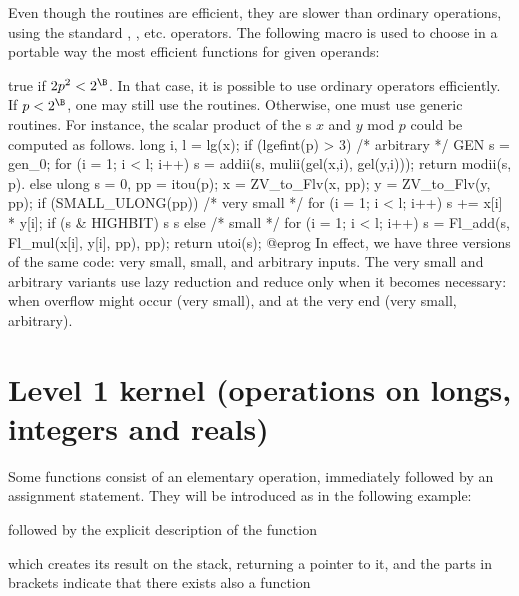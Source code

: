
Even though the  routines are efficient, they are slower than
ordinary  operations, using the standard \kbd{+}, \kbd{\%}, etc.
operators.
The following macro is used to choose in a portable way the most efficient
functions for given operands:

 true if $2p^2 <2^\B$. In that case, it is
possible to use ordinary operators efficiently. If $p < 2^\B$, one
may still use the  routines. Otherwise, one must use generic
routines. For instance, the scalar product of the s $x$ and $y$ mod
$p$ could be computed as follows.
\bprog
    long i, l = lg(x);
    if (lgefint(p) > 3)
    { /* arbitrary */
      GEN s = gen_0;
      for (i = 1; i < l; i++) s = addii(s, mulii(gel(x,i), gel(y,i)));
      return modii(s, p).
    }
    else
    {
      ulong s = 0, pp = itou(p);
      x = ZV_to_Flv(x, pp);
      y = ZV_to_Flv(y, pp);
      if (SMALL_ULONG(pp))
      { /* very small */
        for (i = 1; i < l; i++)
        {
          s += x[i] * y[i];
          if (s & HIGHBIT) s %
        }
        s %
      }
      else
      { /* small */
        for (i = 1; i < l; i++)
          s = Fl_add(s, Fl_mul(x[i], y[i], pp), pp);
      }
      return utoi(s);
    }
@eprog\noindent
In effect, we have three versions of the same code: very small, small, and
arbitrary inputs. The very small and arbitrary variants use lazy reduction
and reduce only when it becomes necessary: when overflow might occur (very
small), and at the very end (very small, arbitrary).

\section{Level 1 kernel (operations on longs, integers and reals)}

 Some functions consist of an elementary operation,
immediately followed by an assignment statement. They will be introduced as
in the following example:

 followed by the explicit
description of the function


\noindent which creates its result on the stack, returning a  pointer
to it, and the parts in brackets indicate that there exists also a function


